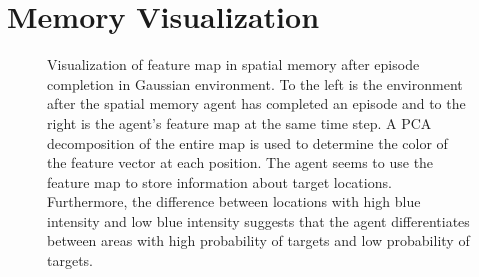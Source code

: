 \chapter{Memory Visualization}
\label{app:memory}

\begin{figure}
    \centering
    
    \caption[Spatial memory visualization]{Visualization of feature map in spatial memory after episode completion in Gaussian environment. To the left is the environment after the spatial memory agent has completed an episode and to the right is the agent's feature map at the same time step. A PCA decomposition of the entire map is used to determine the color of the feature vector at each position. The agent seems to use the feature map to store information about target locations. Furthermore, the difference between locations with high blue intensity and low blue intensity suggests that the agent differentiates between areas with high probability of targets and low probability of targets.}
    \label{fig:memory}
\end{figure}    
